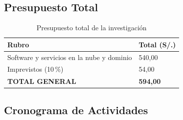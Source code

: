 \documentclass[12pt,a4paper,oneside]{report}
\begin{document}
\subsection{Presupuesto Total}

\begin{table}[H]
\centering
\caption{Presupuesto total de la investigación}
\begin{tabular}{|p{7cm}|p{4cm}|}
\hline
\rowcolor{gray!20}
\textbf{Rubro} & \textbf{Total (S/.)} \\
\hline
Software y servicios en la nube y dominio & 540,00 \\
\hline
Imprevistos (10\,\%) & 54,00 \\
\hline
\textbf{TOTAL GENERAL} & \textbf{594,00} \\
\hline
\end{tabular}
\label{tab:presupuesto_total}
\end{table}

\subsection{Cronograma de Actividades}
\end{document}
